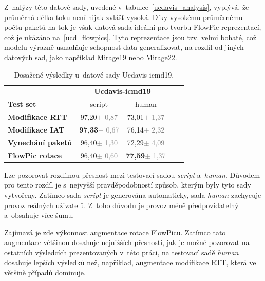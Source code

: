 Z~nalýzy této datové sady, uvedené v~tabulce~\ref{ucdavis_analysis}, vyplývá, že průměrná délka toku není nijak zvlášť vysoká. Díky vysokému průměrnému počtu paketů na tok je však datová sada ideální pro tvorbu FlowPic reprezentací, což je ukázáno na~\ref{ucd_flowpics}. Tyto reprezentace jsou tzv. velmi bohaté, což modelu výrazně usnadňuje schopnost data generalizovat, na rozdíl od jiných datových sad, jako například Mirage19 nebo Mirage22.

\begin{table}[H]
    \centering
    \begin{tabular}{lcccc}
        \toprule
          & \multicolumn{2}{c}{\textbf{Ucdavis-icmd19}} \\
          \cmidrule(lr){2-3}
         \textbf{Test set} & script & human \\
        \midrule
        \textbf{Modifikace RTT} & 97,20{\tiny\textcolor{gray}{$\pm$ 0,87}} & 73,01{\tiny\textcolor{gray}{$\pm$ 1,37}}\\
        \textbf{Modifikace IAT} & \textbf{97,33}{\tiny\textcolor{gray}{$\pm$ 0,67}} & 76,14{\tiny\textcolor{gray}{$\pm$ 2,32}} \\
        \textbf{Vynechání paketů} & 96,40{\tiny\textcolor{gray}{$\pm$ 1,30}} & 72,29{\tiny\textcolor{gray}{$\pm$ 4,09}} \\
        \textbf{FlowPic rotace} & 96,40{\tiny\textcolor{gray}{$\pm$ 0,60}} & \textbf{77,59}{\tiny\textcolor{gray}{$\pm$ 1,37}} \\
        \bottomrule
    \end{tabular}
    \caption{Dosažené výsledky u~datové sady Ucdavis-icmd19.}
\end{table}

Lze pozorovat rozdílnou přesnost mezi testovací sadou \textit{script} a~\textit{human}. Důvodem pro tento rozdíl je s~nejvyšší pravděpodobností způsob, kterým byly tyto sady vytvořeny. Zatímco sada \textit{script} je generována automaticky, sada \textit{human} zachycuje provoz reálných uživatelů. Z~toho důvodu je provoz méně předpovídatelný a~obsahuje více šumu. 

Zajímavá je zde výkonnost augmentace rotace FlowPicu. Zatímco tato augmentace většinou dosahuje nejnižších přesností, jak je možné pozorovat na ostatních výsledcích prezentovaných v~této práci, na testovací sadě \textit{human} dosahuje lepších výsledků než, například, augmentace modifikace RTT, která ve většině případů dominuje.

